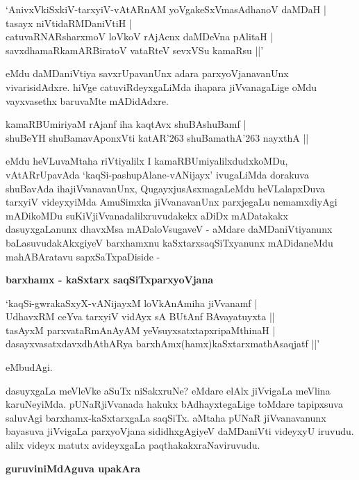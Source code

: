 \begin{shloka}
`AnivxVkiSxkiV-tarxyiV-vAtARnAM yoVgakeSxVmasAdhanoV daMDaH |\\\label{90}
tasayx niVtidaRMDaniVtiH |\\
catuvaRNARsharxmoV loVkoV rAjAcnx daMDeVna pAlitaH |\\\label{90}
savxdhamaRkamARBiratoV vataRteV sevxVSu kamaRsu ||'
\end{shloka}

eMdu daMDaniVtiya savxrUpavanUnx adara parxyoVjanavanUnx vivarisidAdxre. hiVge catuviRdeyxgaLiMda ihapara jiVvanagaLige oMdu vayxvasethx baruvaMte mADidAdxre.

\begin{shloka}
kamaRBUmiriyaM rAjanf iha kaqtAvx shuBAshuBamf |\\\label{90}
shuBeYH shuBamavAponxVti katAR\char'263 shuBamathA\char'263 nayxthA ||
\end{shloka}

eMdu heVLuvaMtaha riVtiyalilx I kamaRBUmiyalilxdudxkoMDu, vAtARrUpavAda `kaqSi-pashupAlane-vANijayx' ivugaLiMda dorakuva shuBavAda ihajiVvanavanUnx, QugayxjusAsxmagaLeMdu heVLalapxDuva tarxyiV videyxyiMda AmuSimxka jiVvanavanUnx parxjegaLu nemamxdiyAgi mADikoMDu suKiVjiVvanadalilxruvudakekx aDiDx mADatakakx dasuyxgaLanunx dhavxMsa mADaloVsugaveV - aMdare daMDaniVtiyanunx baLasuvudakAkxgiyeV barxhamxnu kaSxtarxsaqSiTxyanunx mADidaneMdu mahABAratavu sapxSaTxpaDiside - 

\noindent
\textbf{barxhamx - kaSxtarx saqSiTxparxyoVjana}\label{page91}

\begin{shloka}
`kaqSi-gwrakaSxyX-vANijayxM loVkAnAmiha jiVvanamf |\\\label{91}
UdhavxRM ceYva tarxyiV vidAyx sA BUtAnf BAvayatuyxta ||\\
tasAyxM parxvataRmAnAyAM yeVsuyxsatxtapxripaMthinaH |\\
dasayxvasatxdavxdhAthARya barxhAmx(hamx)kaSxtarxmathAsaqjatf ||'
\end{shloka}

eMbudAgi.

dasuyxgaLa meVleVke aSuTx niSakxruNe? eMdare elAlx jiVvigaLa meVlina karuNeyiMda. pUNaRjiVvanada hakukx bAdhayxtegaLige toMdare tapipxsuva saluvAgi barxhamx-kaSxtarxgaLa saqSiTx. aMtaha pUNaR jiVvanavanunx bayasuva jiVvigaLa parxyoVjana sididhxgAgiyeV daMDaniVti videyxyU iruvudu. alilx videyx matutx avideyxgaLa paqthakakxraNaviruvudu.

\noindent
\textbf{guruviniMdAguva upakAra}\label{page91}

